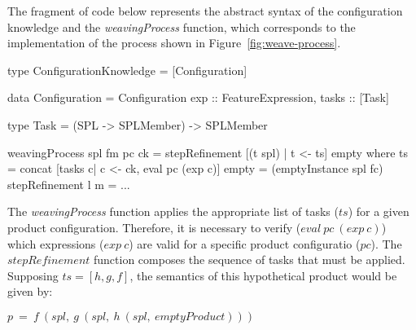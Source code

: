 \appendix

The fragment of code below represents the abstract syntax of the configuration knowledge and the \emph{weavingProcess} function, which corresponds to the implementation of the process shown in Figure~\ref{fig:weave-process}.
 \newpage
 \begin{code}
 type ConfigurationKnowledge = [Configuration]

 data Configuration = Configuration {
  exp :: FeatureExpression,
  tasks :: [Task] 	
 }

 type Task = (SPL -> SPLMember) -> SPLMember

 weavingProcess spl fm pc ck =
    stepRefinement [(t spl) | t <- ts] empty
    where
     ts = concat [tasks c| c <- ck, eval pc (exp c)]
     empty = (emptyInstance spl fc)
     stepRefinement l m = ...   	
 \end{code}
 
 The \emph{weavingProcess} function applies the appropriate list of tasks ($ts$) 
 for a given product configuration. Therefore, it is necessary to verify  ($eval\ pc\ (exp\ c)$) which expressions ($exp\ c$) are valid for a specific product configuratio ($pc$). The $stepRefinement$ function composes the sequence of tasks that must
 be applied. Supposing $ts = [h,g,f]$, the semantics of
 this hypothetical product would be given by:

 \begin{center}
 $ p\ =\ f\ (spl,\ g\ (spl,\ h\ (spl,\ emptyProduct)))  $
 \end{center}